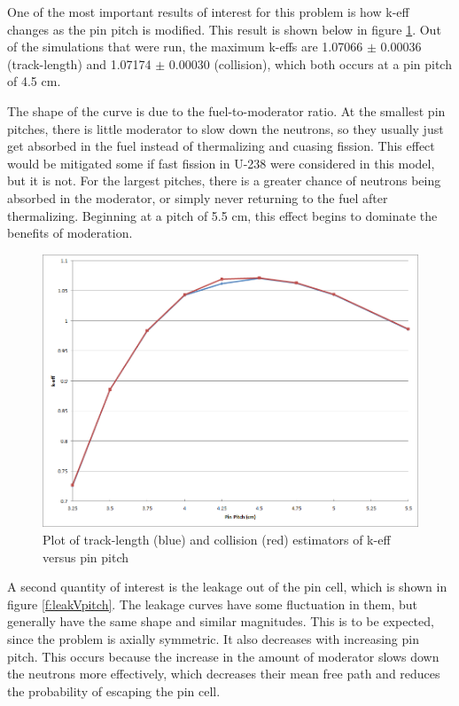One of the most important results of interest for this problem is how k-eff changes as the pin pitch is modified.  This result is shown below in figure \ref{f:keffVpitch}.  Out of the simulations that were run, the maximum k-effs are 1.07066 $\pm$ 0.00036 (track-length) and 1.07174 $\pm$ 0.00030 (collision), which both occurs at a pin pitch of 4.5 cm.

The shape of the curve is due to the fuel-to-moderator ratio.  At the smallest pin pitches, there is little moderator to slow down the neutrons, so they usually just get absorbed in the fuel instead of thermalizing and cuasing fission.  This effect would be mitigated some if fast fission in U-238 were considered in this model, but it is not.  For the largest pitches, there is a greater chance of neutrons being absorbed in the moderator, or simply never returning to the fuel after thermalizing.  Beginning at a pitch of 5.5 cm, this effect begins to dominate the benefits of moderation.

\begin{figure}[H]
\centering
\includegraphics[width=0.8\linewidth]{images/keff_v_pitch.png}
\caption{Plot of track-length (blue) and collision (red) estimators of k-eff versus pin pitch}
\label{f:keffVpitch}
\end{figure}

A second quantity of interest is the leakage out of the pin cell, which is shown in figure \ref{f:leakVpitch}.  The leakage curves have some fluctuation in them, but generally have the same shape and similar magnitudes.  This is to be expected, since the problem is axially symmetric.  It also decreases with increasing pin pitch.  This occurs because the increase in the amount of moderator slows down the neutrons more effectively, which decreases their mean free path and reduces the probability of escaping the pin cell.

